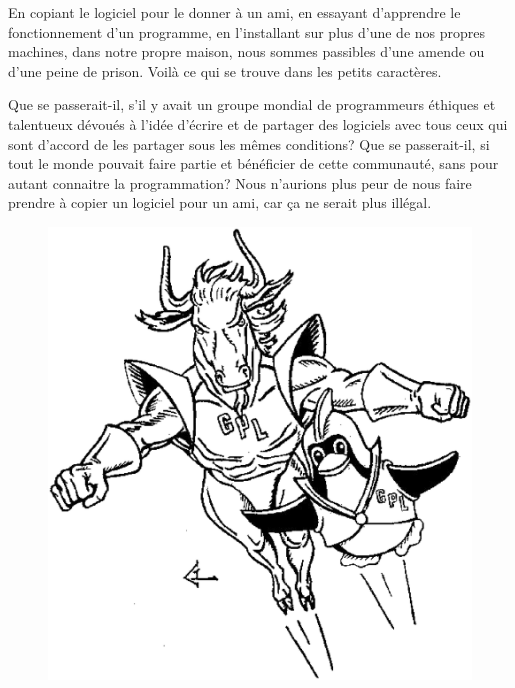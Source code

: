 \documentclass[twoside,12pt]{article}
\begin{document}
En copiant le logiciel pour le donner à un ami, en essayant d'apprendre le
fonctionnement d'un programme, en l'installant sur plus d'une de nos propres
machines, dans notre propre maison, nous sommes passibles d'une amende ou d'une
peine de prison. Voilà ce qui se trouve dans les petits caractères.


Que se passerait-il, s'il y avait un groupe mondial de programmeurs éthiques et
talentueux dévoués à l'idée d'écrire et de partager des logiciels avec tous
ceux qui sont d'accord de les partager sous les mêmes conditions? Que se
passerait-il, si tout le monde pouvait faire partie et bénéficier de cette
communauté, sans pour autant connaitre la programmation? Nous n'aurions plus
peur de nous faire prendre à copier un logiciel pour un ami, car ça ne serait
plus illégal.


\begin{figure}
 \begin{center}
   \includegraphics[scale=0.23]{dynamic-duo-bw.eps}
 \end{center}
\end{figure}
\end{document}
